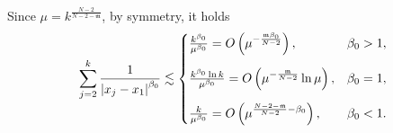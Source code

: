 \documentclass[11pt,a4paper]{amsart}
\begin{document}
  Since $\mu=k^{\frac{N-2}{N-2-\mathfrak m}}$,  by symmetry, it holds
  \begin{align}\label{eq.lemma.appendix_estimates_3_temp}
    \begin{aligned}
      \sum_{j=2}^k \frac{1}{\left|x_{j}-x_{1}\right|^{\beta_{0}}}  \lesssim
     \begin{cases}\frac{ k^{\beta_{0}} }{\mu^{\beta_{0}}} = O \left(\mu^{-\frac{\mathfrak m\beta_0}{N-2}}\right) , & \beta_{0} > 1, \vspace{10pt}\\ \frac{ k^{\beta_0}\ln k}{\mu^{\beta_{0}}}= O \left(\mu^{-\frac{\mathfrak m}{N-2}}\ln\mu\right), & \beta_{0} = 1, \vspace{10pt}\\ \frac{ k}{\mu^{\beta_{0}}} = O\left(\mu^{\frac{N-2-\mathfrak m}{N-2}-\beta_0}\right), & \beta_{0} < 1.\end{cases}
    \end{aligned}
  \end{align}
  

 
\end{document}
